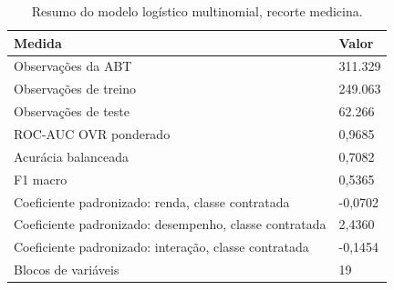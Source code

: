 \begin{table}
\caption{Resumo do modelo logístico multinomial, recorte medicina.}
\label{tab:tabela_logit_ternario_recorte_medicina_principal_holdout_80_20_e5}
\begin{tabular}{ll}
\toprule
Medida & Valor \\
\midrule
Observações da ABT & 311.329 \\
Observações de treino & 249.063 \\
Observações de teste & 62.266 \\
ROC-AUC OVR ponderado & 0,9685 \\
Acurácia balanceada & 0,7082 \\
F1 macro & 0,5365 \\
Coeficiente padronizado: renda, classe contratada & -0,0702 \\
Coeficiente padronizado: desempenho, classe contratada & 2,4360 \\
Coeficiente padronizado: interação, classe contratada & -0,1454 \\
Blocos de variáveis & 19 \\
\bottomrule
\end{tabular}
\end{table}
